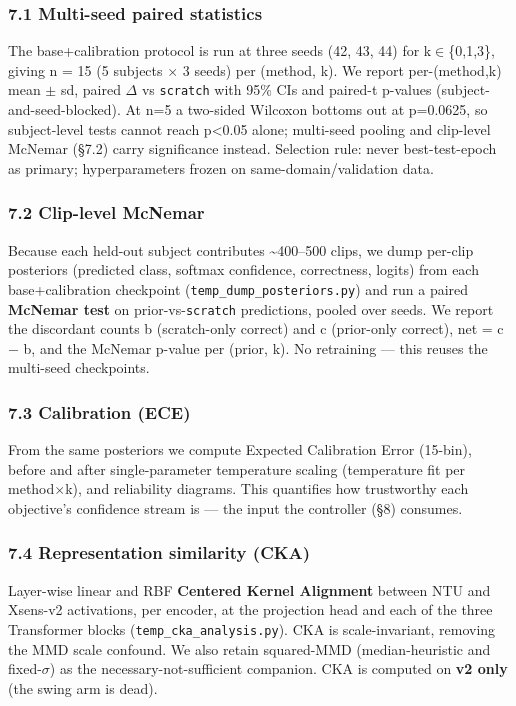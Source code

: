 \subsubsection{7.1 Multi-seed paired statistics}
The base+calibration protocol is run at three seeds (42, 43, 44) for k$\in$\{0,1,3\}, giving n = 15 (5 subjects $\times$ 3 seeds) per (method, k). We report per-(method,k) mean $\pm$ sd, paired $\Delta$ vs \texttt{scratch} with 95\% CIs and paired-t p-values (subject-and-seed-blocked). At n=5 a two-sided Wilcoxon bottoms out at p=0.0625, so subject-level tests cannot reach p<0.05 alone; multi-seed pooling and clip-level McNemar (\S{}7.2) carry significance instead. Selection rule: never best-test-epoch as primary; hyperparameters frozen on same-domain/validation data.

\subsubsection{7.2 Clip-level McNemar}
Because each held-out subject contributes \textasciitilde{}400--500 clips, we dump per-clip posteriors (predicted class, softmax confidence, correctness, logits) from each base+calibration checkpoint (\texttt{temp\_dump\_posteriors.py}) and run a paired \textbf{McNemar test} on prior-vs-\texttt{scratch} predictions, pooled over seeds. We report the discordant counts b (scratch-only correct) and c (prior-only correct), net = c $-$ b, and the McNemar p-value per (prior, k). No retraining --- this reuses the multi-seed checkpoints.

\subsubsection{7.3 Calibration (ECE)}
From the same posteriors we compute Expected Calibration Error (15-bin), before and after single-parameter temperature scaling (temperature fit per method$\times$k), and reliability diagrams. This quantifies how trustworthy each objective's confidence stream is --- the input the controller (\S{}8) consumes.

\subsubsection{7.4 Representation similarity (CKA)}
Layer-wise linear and RBF \textbf{Centered Kernel Alignment} between NTU and Xsens-v2 activations, per encoder, at the projection head and each of the three Transformer blocks (\texttt{temp\_cka\_analysis.py}). CKA is scale-invariant, removing the MMD scale confound. We also retain squared-MMD (median-heuristic and fixed-$\sigma$) as the necessary-not-sufficient companion. CKA is computed on \textbf{v2 only} (the swing arm is dead).

